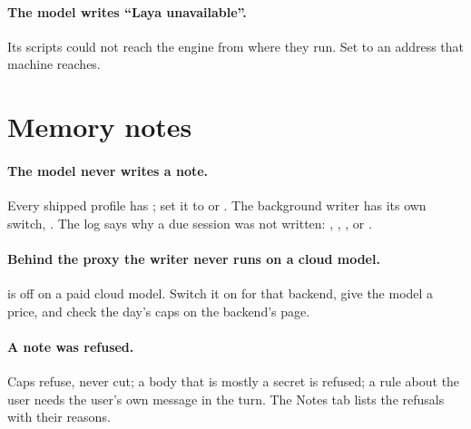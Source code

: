 \paragraph{The model writes ``Laya unavailable''.} Its scripts could not reach the engine from where they run. Set  to an address that machine reaches.

\section{Memory notes}

\paragraph{The model never writes a note.} Every shipped profile has ; set it to  or . The background writer has its own switch, . The log says why a due session was not written: , , ,  or .

\paragraph{Behind the proxy the writer never runs on a cloud model.}  is off on a paid cloud model. Switch it on for that backend, give the model a price, and check the day's caps on the backend's page.

\paragraph{A note was refused.} Caps refuse, never cut; a body that is mostly a secret is refused; a rule about the user needs the user's own message in the turn. The Notes tab lists the refusals with their reasons.
